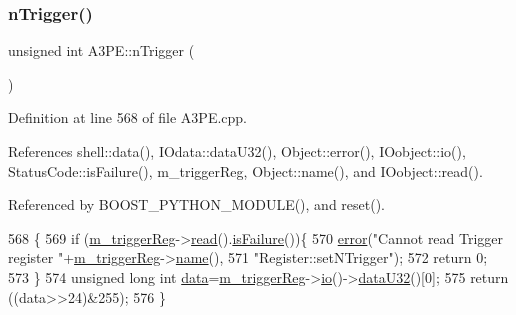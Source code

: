 \mbox{\label{classA3PE_a3398fa3ce59a4b1b946e7b4ab4912580}} 
\subsubsection{\texorpdfstring{n\+Trigger()}{nTrigger()}}
{\footnotesize\ttfamily unsigned int A3\+P\+E\+::n\+Trigger (\begin{DoxyParamCaption}{ }\end{DoxyParamCaption})}



Definition at line 568 of file A3\+P\+E.\+cpp.



References shell\+::data(), I\+Odata\+::data\+U32(), Object\+::error(), I\+Oobject\+::io(), Status\+Code\+::is\+Failure(), m\+\_\+trigger\+Reg, Object\+::name(), and I\+Oobject\+::read().



Referenced by B\+O\+O\+S\+T\+\_\+\+P\+Y\+T\+H\+O\+N\+\_\+\+M\+O\+D\+U\+L\+E(), and reset().


\begin{DoxyCode}
568                            \{
569   \textcolor{keywordflow}{if} (\hyperlink{classA3PE_a750158ae488121ab7969452f061e678c}{m\_triggerReg}->\hyperlink{classIOobject_aa07610c11963b1db6710e3c76ceea456}{read}().\hyperlink{classStatusCode_a5dd22dc6eb2c52fc4cabc58f6dea2eb7}{isFailure}())\{
570     \hyperlink{classObject_a204a95f57818c0f811933917a30eff45}{error}(\textcolor{stringliteral}{"Cannot read Trigger register "}+\hyperlink{classA3PE_a750158ae488121ab7969452f061e678c}{m\_triggerReg}->\hyperlink{classObject_a300f4c05dd468c7bb8b3c968868443c1}{name}(),
571         \textcolor{stringliteral}{"Register::setNTrigger"});
572     \textcolor{keywordflow}{return} 0;
573   \}
574   \textcolor{keywordtype}{unsigned} \textcolor{keywordtype}{long} \textcolor{keywordtype}{int} \hyperlink{namespaceshell_a5ea2525995cedc3efd69ea8a7f034d1e}{data}=\hyperlink{classA3PE_a750158ae488121ab7969452f061e678c}{m\_triggerReg}->\hyperlink{classIOobject_af04fb94137c3d86849f478ac5afab5d1}{io}()->\hyperlink{classIOdata_ab0e3cd09f46c1c3712f797116f6da074}{dataU32}()[0];
575   \textcolor{keywordflow}{return} ((data>>24)&255);
576 \}
\end{DoxyCode}
\mbox{\label{classA3PE_a94ef54086baa29f7f6638c13d8906e56}} 
